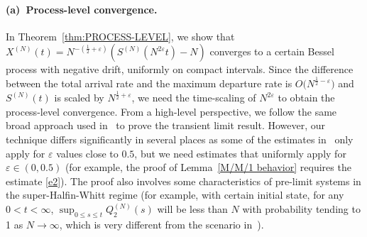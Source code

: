 \documentclass[11pt, reqno]{article}
\numberwithin{equation}{section}
\numberwithin{theorem}{section}
\newcommand\blue[1]{#1}
\begin{document}
\paragraph{(a)~Process-level convergence.}
In Theorem~\ref{thm:PROCESS-LEVEL}, we show that 
$X^{(N)}(t)=N^{-(\frac{1}{2}+\varepsilon)}(S^{(N)}(N^{2\varepsilon}t)-N)$
converges to a certain Bessel process with negative drift, uniformly on compact intervals.
Since the difference between the total arrival rate and the maximum departure rate is $O\big( N^{\frac{1}{2}-\varepsilon}\big)$ and $S^{(N)}(t)$ is scaled by $N^{\frac{1}{2}+\varepsilon}$, we need the time-scaling of $N^{2\varepsilon}$ to obtain the process-level convergence.   
From a high-level perspective, we follow the same broad approach used in~\cite{GW19} to prove the transient limit result. 
However, our technique differs significantly in several places as some of the estimates in~\cite{GW19} only apply for $\varepsilon$ values close to $0.5$, but we need estimates that uniformly apply for $\varepsilon \in (0,0.5)$ (for example, the proof of Lemma~\ref{M/M/1 behavior} requires the estimate \eqref{e2}). \blue{The proof also involves some characteristics of pre-limit systems in the super-Halfin-Whitt regime (for example, with certain initial state, for any $0< t<\infty$, $\sup_{0\leq s\leq t}Q^{(N)}_2(s)$ will be less than $N$ with probability tending to 1 as $N\rightarrow\infty$, which is very different from the scenario in~\cite{GW19}).}
\end{document}
